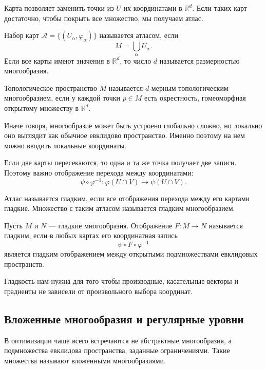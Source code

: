 \documentclass[a4paper,12pt]{article}
\newcommand{\R}{\mathbb{R}}
\begin{document}
Карта позволяет заменить точки из $U$ их координатами в $\R^d$. Если таких карт достаточно, чтобы покрыть все множество, мы получаем атлас.

\begin{definition}
    Набор карт $\mathcal A=\{(U_\alpha,\varphi_\alpha)\}$ называется атласом, если
    \[
        M=\bigcup_\alpha U_\alpha.
    \]
    Если все карты имеют значения в $\R^d$, то число $d$ называется размерностью многообразия.
\end{definition}

\begin{definition}
    Топологическое пространство $M$ называется $d$-мерным топологическим многообразием, если у каждой точки $p\in M$ есть окрестность, гомеоморфная открытому множеству в $\R^d$.
\end{definition}

Иначе говоря, многообразие может быть устроено глобально сложно, но локально оно выглядит как обычное евклидово пространство. Именно поэтому на нем можно вводить локальные координаты.

Если две карты пересекаются, то одна и та же точка получает две записи. Поэтому важно отображение перехода между координатами:
\[
    \psi\circ\varphi^{-1}:\varphi(U\cap V)\to\psi(U\cap V).
\]

\begin{definition}
    Атлас называется гладким, если все отображения перехода между его картами гладкие. Множество с таким атласом называется гладким многообразием.
\end{definition}

\begin{definition}
    Пусть $M$ и $N$ --- гладкие многообразия. Отображение $F:M\to N$ называется гладким, если в любых картах его координатная запись
    \[
        \psi\circ F\circ\varphi^{-1}
    \]
    является гладким отображением между открытыми подмножествами евклидовых пространств.
\end{definition}

Гладкость нам нужна для того чтобы производные, касательные векторы и градиенты не зависели от произвольного выбора координат.

\subsection{Вложенные многообразия и регулярные уровни}

В оптимизации чаще всего встречаются не абстрактные многообразия, а подмножества евклидова пространства, заданные ограничениями. Такие множества называют вложенными многообразиями.
\end{document}

